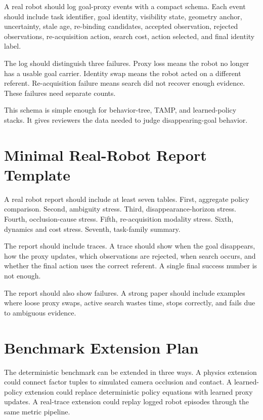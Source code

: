 A real robot should log goal-proxy events with a compact schema. Each event should include task identifier, goal identity, visibility state, geometry anchor, uncertainty, stale age, re-binding candidates, accepted observation, rejected observations, re-acquisition action, search cost, action selected, and final identity label.

The log should distinguish three failures. Proxy loss means the robot no longer has a usable goal carrier. Identity swap means the robot acted on a different referent. Re-acquisition failure means search did not recover enough evidence. These failures need separate counts.

This schema is simple enough for behavior-tree, TAMP, and learned-policy stacks. It gives reviewers the data needed to judge disappearing-goal behavior.

\section{Minimal Real-Robot Report Template}

A real robot report should include at least seven tables. First, aggregate policy comparison. Second, ambiguity stress. Third, disappearance-horizon stress. Fourth, occlusion-cause stress. Fifth, re-acquisition modality stress. Sixth, dynamics and cost stress. Seventh, task-family summary.

The report should include traces. A trace should show when the goal disappears, how the proxy updates, which observations are rejected, when search occurs, and whether the final action uses the correct referent. A single final success number is not enough.

The report should also show failures. A strong paper should include examples where loose proxy swaps, active search wastes time, \method stops correctly, and \method fails due to ambiguous evidence.

\section{Benchmark Extension Plan}

The deterministic benchmark can be extended in three ways. A physics extension could connect factor tuples to simulated camera occlusion and contact. A learned-policy extension could replace deterministic policy equations with learned proxy updates. A real-trace extension could replay logged robot episodes through the same metric pipeline.

